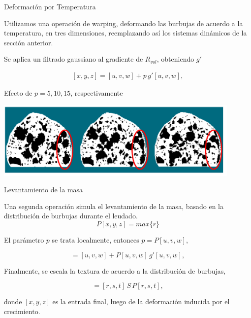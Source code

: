 \documentclass[spanish]{beamer}
\begin{document}
\begin{frame}{Deformación por Temperatura}

Utilizamos una operación de warping, deformando las burbujas de acuerdo a la temperatura, en tres dimensiones, reemplazando así los sistemas dinámicos de la sección anterior.

Se aplica un filtrado gaussiano al gradiente de $R_{vol}$, obteniendo $g'$

\begin{align*}
\displaystyle
[x,y,z] = [u,v,w] + p\, g'[u,v,w],
\end{align*}

Efecto de $p = 5,10,15$, respectivamente
\centerline{\includegraphics[width=12cm]{../figures/parameterp}}

\end{frame}

\begin{frame}{Levantamiento de la masa}

Una segunda operación simula el levantamiento de la masa, basado en la distribución de burbujas durante el leudado.
\begin{equation*}
P[x,y,z] = max \bigg\{r\bigg\}
\end{equation*}

El parámetro $p$ se trata localmente, entonces $p = P[u,v,w],$

\begin{equation*}
[r,s,t] = [u,v,w] + P[u,v,w] \, g'[u,v,w],
\end{equation*}



Finalmente, se escala la textura de acuerdo a la distribución de burbujas,


\begin{equation}
[x,y,z] = [r,s,t]\, S \, P[r,s,t],
\end{equation}

\noindent donde $[x,y,z]$ es la entrada final, luego de la deformación inducida por el crecimiento.

\end{frame}
\end{document}
